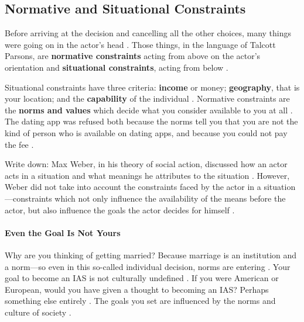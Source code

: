 \subsection{Normative and Situational Constraints}
Before arriving at the decision and cancelling all the other choices, many things were going on in the actor's head . Those things, in the language of Talcott Parsons, are \textbf{normative constraints} acting from above on the actor's orientation and \textbf{situational constraints}, acting from below .

\begin{KeyConcept}
Situational constraints have three criteria: \textbf{income} or money; \textbf{geography}, that is your location; and the \textbf{capability} of the individual .
Normative constraints are the \textbf{norms and values} which decide what you consider available to you at all .
The dating app was refused both because the norms tell you that you are not the kind of person who is available on dating apps, and because you could not pay the fee .
\end{KeyConcept}

\begin{KeyConcept}
Write down: Max Weber, in his theory of social action, discussed how an actor acts in a situation and what meanings he attributes to the situation .
However, Weber did not take into account the constraints faced by the actor in a situation---constraints which not only influence the availability of the means before the actor, but also influence the goals the actor decides for himself .
\end{KeyConcept}

\paragraph{Even the Goal Is Not Yours}
Why are you thinking of getting married? Because marriage is an institution and a norm---so even in this so-called individual decision, norms are entering .
Your goal to become an IAS is not culturally undefined . If you were American or European, would you have given a thought to becoming an IAS? Perhaps something else entirely . The goals you set are influenced by the norms and culture of society .

